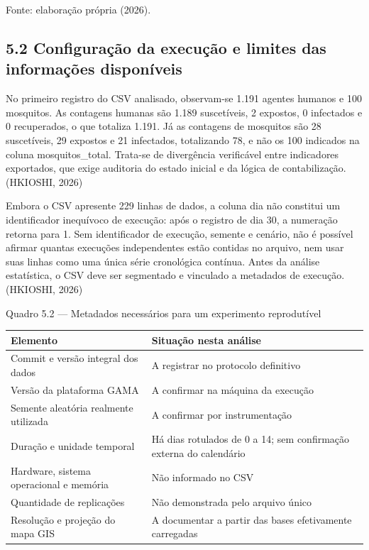 Fonte: elaboração própria (2026).

\subsection{5.2 Configuração da execução e limites das informações
disponíveis}\label{configurauxe7uxe3o-da-execuuxe7uxe3o-e-limites-das-informauxe7uxf5es-disponuxedveis}

No primeiro registro do CSV analisado, observam-se 1.191 agentes humanos
e 100 mosquitos. As contagens humanas são 1.189 suscetíveis, 2 expostos,
0 infectados e 0 recuperados, o que totaliza 1.191. Já as contagens de
mosquitos são 28 suscetíveis, 29 expostos e 21 infectados, totalizando
78, e não os 100 indicados na coluna mosquitos\_total. Trata-se de
divergência verificável entre indicadores exportados, que exige
auditoria do estado inicial e da lógica de contabilização. (HKIOSHI,
2026)

Embora o CSV apresente 229 linhas de dados, a coluna dia não constitui
um identificador inequívoco de execução: após o registro de dia 30, a
numeração retorna para 1. Sem identificador de execução, semente e
cenário, não é possível afirmar quantas execuções independentes estão
contidas no arquivo, nem usar suas linhas como uma única série
cronológica contínua. Antes da análise estatística, o CSV deve ser
segmentado e vinculado a metadados de execução. (HKIOSHI, 2026)

Quadro 5.2 --- Metadados necessários para um experimento reprodutível

\begin{longtable}[]{@{}
  >{\raggedright\arraybackslash}p{}
  >{\raggedright\arraybackslash}p{}@{}}
\toprule\noalign{}
\begin{minipage}[b]{\linewidth}\raggedright
\textbf{Elemento}
\end{minipage} & \begin{minipage}[b]{\linewidth}\raggedright
\textbf{Situação nesta análise}
\end{minipage} \\
\midrule\noalign{}
\endhead
\bottomrule\noalign{}
\endlastfoot
Commit e versão integral dos dados & A registrar no protocolo
definitivo \\
Versão da plataforma GAMA & A confirmar na máquina da execução \\
Semente aleatória realmente utilizada & A confirmar por
instrumentação \\
Duração e unidade temporal & Há dias rotulados de 0 a 14; sem
confirmação externa do calendário \\
Hardware, sistema operacional e memória & Não informado no CSV \\
Quantidade de replicações & Não demonstrada pelo arquivo único \\
Resolução e projeção do mapa GIS & A documentar a partir das bases
efetivamente carregadas \\
\end{longtable}

